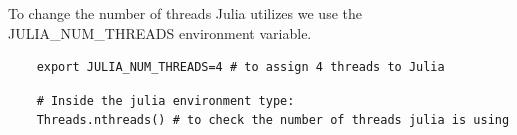 To change the number of threads Julia utilizes we use the JULIA\_NUM\_THREADS environment variable.
\begin{verbatim}
    export JULIA_NUM_THREADS=4 # to assign 4 threads to Julia
\end{verbatim}
\begin{verbatim} 
    # Inside the julia environment type:
    Threads.nthreads() # to check the number of threads julia is using
\end{verbatim}

